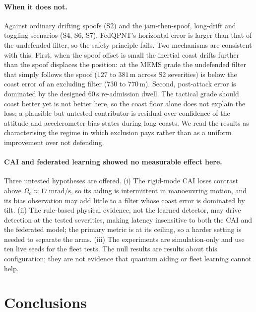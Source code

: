 \documentclass[12pt,a4paper]{article}
\begin{document}
\paragraph{When it does not.} Against ordinary drifting spoofs (S2) and the jam-then-spoof, long-drift and toggling scenarios (S4, S6, S7), FedQPNT's horizontal error is larger than that of the undefended filter, so the safety principle fails. Two mechanisms are consistent with this. First, when the spoof offset is small the inertial coast drifts further than the spoof displaces the position: at the MEMS grade the undefended filter that simply follows the spoof ($127$ to $381\,\mathrm{m}$ across S2 severities) is below the coast error of an excluding filter ($730$ to $770\,\mathrm{m}$). Second, post-attack error is dominated by the designed $60\,\mathrm{s}$ re-admission dwell. The tactical grade should coast better yet is not better here, so the coast floor alone does not explain the loss; a plausible but untested contributor is residual over-confidence of the attitude and accelerometer-bias states during long coasts. We read the results as characterising the regime in which exclusion pays rather than as a uniform improvement over not defending.

\paragraph{CAI and federated learning showed no measurable effect here.} Three untested hypotheses are offered. (i) The rigid-mode CAI loses contrast above $\Omega_c\approx17\,\mathrm{mrad/s}$, so its aiding is intermittent in manoeuvring motion, and its bias observation may add little to a filter whose coast error is dominated by tilt. (ii) The rule-based physical evidence, not the learned detector, may drive detection at the tested severities, making latency insensitive to both the CAI and the federated model; the primary metric is at its ceiling, so a harder setting is needed to separate the arms. (iii) The experiments are simulation-only and use ten live seeds for the fleet tests. The null results are results about this configuration; they are not evidence that quantum aiding or fleet learning cannot help.

\section{Conclusions}
\label{sec:conclusion}
\end{document}
